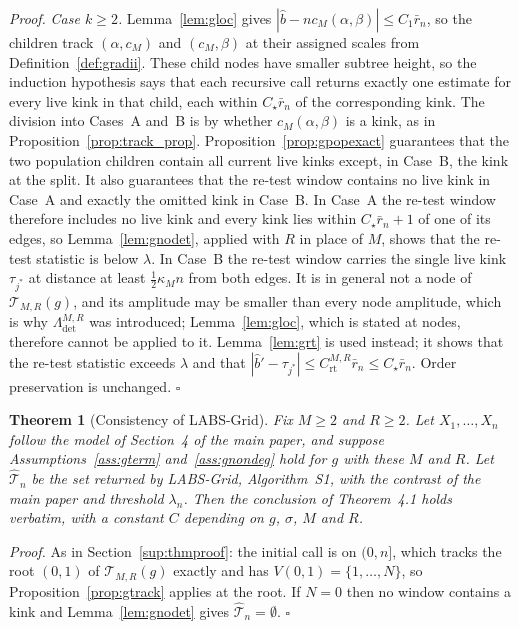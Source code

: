 \documentclass[12pt, a4paper]{article}
\newcommand{\qed}{\hfill$\square$}
\newenvironment{proof}[1][Proof]{\par\noindent\textit{#1.}\space}{\qed\par\medskip}
\newtheorem{theorem}{Theorem}[section]
\newcommand{\mainthm}{Theorem~4.1}
\begin{document}
\begin{proof}
\emph{Case $k \ge 2$.} Lemma~\ref{lem:gloc} gives
$|\hat b - n c_M(\alpha,\beta)| \le C_1\bar r_n$, so the children track
$(\alpha, c_M)$ and $(c_M,\beta)$ at their assigned scales from
Definition~\ref{def:gradii}. These child nodes have smaller subtree height, so
the induction hypothesis says that each recursive call returns exactly one
estimate for every live kink in that child, each within
$C_\star\bar r_n$ of the corresponding kink. The
division into Cases~A and~B is by whether $c_M(\alpha,\beta)$ is a kink, as in
Proposition~\ref{prop:track_prop}. Proposition~\ref{prop:gpopexact} guarantees
that the two population children contain all current live kinks except, in
Case~B, the kink at the split. It also guarantees that the re-test window
contains no live kink in Case~A and exactly the omitted kink in Case~B. In
Case~A the re-test window therefore includes no live
kink and every kink lies within $C_\star\bar r_n + 1$ of one of its edges, so
Lemma~\ref{lem:gnodet}, applied with $R$ in place of $M$, shows that the
re-test statistic is below $\lambda$. In Case~B the re-test window carries the single live kink $\tau_{j^*}$ at distance at least $\tfrac12\kappa_M n$ from both edges. It is in general not a node of $\mathcal{T}_{M,R}(g)$, and its amplitude may be smaller than every node amplitude, which is why $\Lambda^{M,R}_{\mathrm{det}}$ was introduced; Lemma~\ref{lem:gloc}, which is stated at nodes, therefore cannot be applied to it. Lemma~\ref{lem:grt} is used instead; it shows that the re-test statistic exceeds $\lambda$ and that $|\hat b' - \tau_{j^*}| \le C^{M,R}_{\mathrm{rt}}\bar r_n \le C_\star\bar r_n$. Order preservation is unchanged.
\end{proof}

\begin{theorem}[Consistency of LABS-Grid]
\label{thm:grid}
Fix $M \ge 2$ and $R \ge 2$. Let $X_1,\ldots,X_n$ follow the model of Section~4 of the main paper, and suppose Assumptions~\ref{ass:gterm} and~\ref{ass:gnondeg} hold for $g$ with these $M$ and $R$. Let
$\hat{\mathcal{T}}_n$ be the set returned by LABS-Grid, Algorithm~S1, with the
contrast of the main paper and threshold $\lambda_n$. Then the conclusion of
\mainthm{} holds verbatim, with a constant $C$ depending on $g$, $\sigma$, $M$
and $R$.
\end{theorem}

\begin{proof}
As in Section~\ref{sup:thmproof}: the initial call is on $(0,n]$, which tracks
the root $(0,1)$ of $\mathcal{T}_{M,R}(g)$ exactly and has
$V(0,1) = \{1,\ldots,N\}$, so Proposition~\ref{prop:gtrack} applies at the
root. If $N = 0$ then no window contains a kink and Lemma~\ref{lem:gnodet}
gives $\hat{\mathcal{T}}_n = \emptyset$.
\end{proof}
\end{document}
